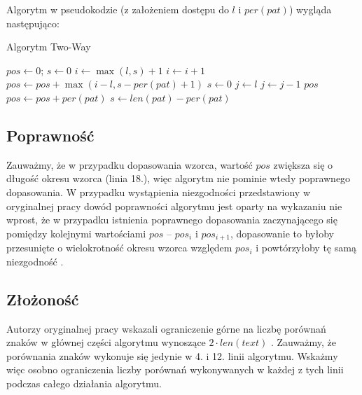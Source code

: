 \noindent
Algorytm w pseudokodzie (z założeniem dostępu do $l$ i $per(pat)$) wygląda następująco:
\begin{algorithm}
\caption{Algorytm Two-Way}\label{alg:tw}
\begin{algorithmic}[1]
\State $pos \gets 0$; $s \gets 0$
    \State $i \gets \max(l, s) + 1$
        \State $i \gets i + 1$
    \EndWhile
        \State $pos \gets pos + \max(i-l, s-per(pat)+1)$
        \State $s \gets 0$
    \Else
        \State $j \gets l$
            \State $j \gets j-1$
        \EndWhile
            \State \Return $pos$
        \EndIf
        \State $pos \gets pos + per(pat)$
        \State $s \gets len(pat) - per(pat)$
    \EndIf
\EndWhile
\end{algorithmic}
\end{algorithm}

\FloatBarrier
\subsection{Poprawność}
Zauważmy, że w przypadku dopasowania wzorca, wartość $pos$ zwiększa się o długość okresu wzorca (linia 18.), więc algorytm nie pominie wtedy poprawnego dopasowania. W przypadku wystąpienia niezgodności przedstawiony w oryginalnej pracy dowód poprawności algorytmu jest oparty na wykazaniu nie wprost, że w przypadku istnienia poprawnego dopasowania zaczynającego się pomiędzy kolejnymi wartościami $pos$ -- $pos_{i}$ i $pos_{i+1}$, dopasowanie to byłoby przesunięte o wielokrotność okresu wzorca względem $pos_{i}$ i powtórzyłoby tę samą niezgodność \cite{TW}.

\subsection{Złożoność}
Autorzy oryginalnej pracy wskazali ograniczenie górne na liczbę porównań znaków w głównej części algorytmu wynoszące $2 \cdot len(text)$ \cite{TW}. Zauważmy, że porównania znaków wykonuje się jedynie w 4. i 12. linii algorytmu. Wskażmy więc osobno ograniczenia liczby porównań wykonywanych w każdej z tych linii podczas całego działania algorytmu. 


